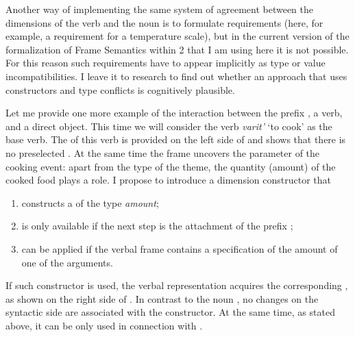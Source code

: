 Another way of implementing the same system of agreement between the dimensions of the verb and the noun is to formulate requirements (here, for example, a requirement for a temperature scale), but in the current version of the formalization of Frame Semantics within  2 that I am using here it is not possible. For this reason such requirements have to appear implicitly as type or value incompatibilities. I leave it to  research to find out whether an approach that uses constructors and type conflicts is cognitively plausible.


Let me provide one more example of the interaction between the prefix , a verb, and a direct object. This time we will consider the verb \textit{varit'} `to cook' as the base verb. The  of this verb is provided on the left side of  and shows that there is no preselected . At the same time the frame uncovers the parameter of the cooking event: apart from the type of the theme, the quantity (amount) of the cooked food plays a role. I propose to introduce a dimension constructor that
\begin{enumerate}
\item constructs a  of the type \textit{amount};
\item is only available if the next step is the attachment of the prefix ;
\item can be applied if the verbal frame contains a specification of the amount of one of the arguments.
\end{enumerate}

If such constructor is used, the verbal representation acquires the corresponding , as shown on the right side of . In contrast to the noun , no changes on the syntactic side are associated with the  constructor. At the same time, as stated above, it can be only used in connection with . 

